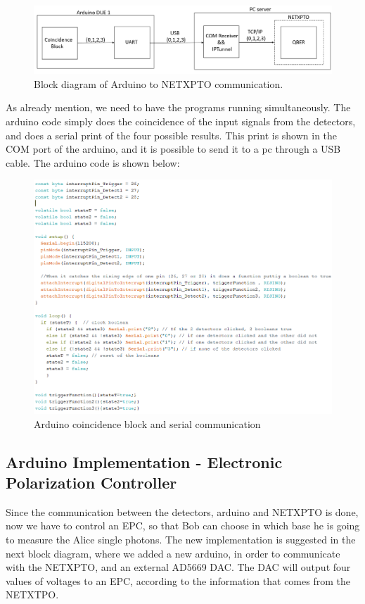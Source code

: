 \begin{refsection}
	\begin{figure}[H]
		\centering
		\includegraphics[width=1.1\linewidth]{./sdf/arduino_quantum_rx/figures/PC.png}
		\caption{Block diagram of Arduino to NETXPTO communication.}
		\label{fig:netxpto}
	\end{figure}
	

	As already mention, we need to have the programs running simultaneously. The arduino code simply does the coincidence of the input signals from the detectors, and does a serial print of the four possible results. This print is shown in the COM port of the arduino, and it is possible to send it to a pc through a USB cable. The arduino code is shown below:
	
	\begin{figure}[H]
		\centering
		\includegraphics[width=0.85\linewidth]{./sdf/arduino_quantum_rx/figures/arduinoComPC.PNG}
		\caption{Arduino coincidence block and serial communication}
		\label{montage}
		
	\end{figure}

	\clearpage
	
	\subsection{Arduino Implementation - Electronic Polarization Controller }
	Since the communication between the detectors, arduino and NETXPTO is done, now we have to control an EPC, so that Bob can choose in which base he is going to measure the Alice single photons. The new implementation is suggested in the next block diagram, where we added a new arduino, in order to communicate with the NETXPTO, and an external AD5669 DAC. The DAC will output four values of voltages to an EPC, according to the information that comes from the NETXTPO.
	

\end{refsection}
